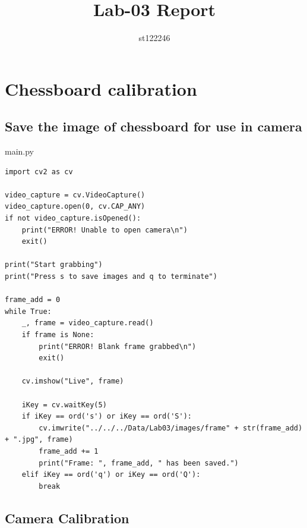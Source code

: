 \documentclass[a4paper, 12pt]{article}
\title{Lab-03 Report}
\author{st122246}
\begin{document}
	\maketitle

	\section{Chessboard calibration}
	\subsection{Save the image of chessboard for use in camera}

	
	main.py
	\begin{lstlisting}
import cv2 as cv

video_capture = cv.VideoCapture()
video_capture.open(0, cv.CAP_ANY)
if not video_capture.isOpened():
    print("ERROR! Unable to open camera\n")
    exit()

print("Start grabbing")
print("Press s to save images and q to terminate")

frame_add = 0
while True:
    _, frame = video_capture.read()
    if frame is None:
        print("ERROR! Blank frame grabbed\n")
        exit()

    cv.imshow("Live", frame)

    iKey = cv.waitKey(5)
    if iKey == ord('s') or iKey == ord('S'):
        cv.imwrite("../../../Data/Lab03/images/frame" + str(frame_add) + ".jpg", frame)
        frame_add += 1
        print("Frame: ", frame_add, " has been saved.")
    elif iKey == ord('q') or iKey == ord('Q'):
        break
	\end{lstlisting}


	\subsection{Camera Calibration}
\end{document}
